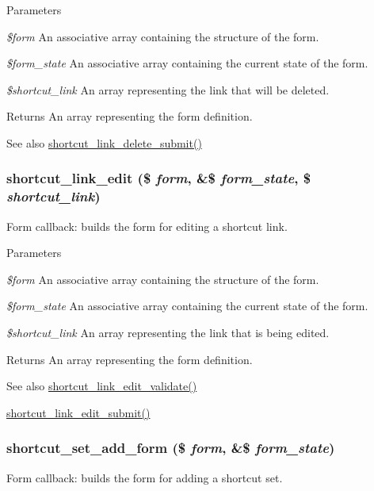 \begin{DoxyParams}{Parameters}
\item[{\em \$form}]An associative array containing the structure of the form. \item[{\em \$form\_\-state}]An associative array containing the current state of the form. \item[{\em \$shortcut\_\-link}]An array representing the link that will be deleted.\end{DoxyParams}
\begin{DoxyReturn}{Returns}
An array representing the form definition.
\end{DoxyReturn}
\begin{DoxySeeAlso}{See also}
\hyperlink{shortcut_8admin_8inc_a3fd35e609a462a9655b912672be3ed4d}{shortcut\_\-link\_\-delete\_\-submit()} 
\end{DoxySeeAlso}
\hypertarget{group__forms_gab5cd373d268cb28d52f75cd0309da63c}{
\subsubsection[{shortcut\_\-link\_\-edit}]{\setlength{\rightskip}{0pt plus 5cm}shortcut\_\-link\_\-edit (\$ {\em form}, \/  \&\$ {\em form\_\-state}, \/  \$ {\em shortcut\_\-link})}}
\label{group__forms_gab5cd373d268cb28d52f75cd0309da63c}
Form callback: builds the form for editing a shortcut link.


\begin{DoxyParams}{Parameters}
\item[{\em \$form}]An associative array containing the structure of the form. \item[{\em \$form\_\-state}]An associative array containing the current state of the form. \item[{\em \$shortcut\_\-link}]An array representing the link that is being edited.\end{DoxyParams}
\begin{DoxyReturn}{Returns}
An array representing the form definition.
\end{DoxyReturn}
\begin{DoxySeeAlso}{See also}
\hyperlink{shortcut_8admin_8inc_a91ed3ef518afe23ce152c277dc7b99cc}{shortcut\_\-link\_\-edit\_\-validate()} 

\hyperlink{shortcut_8admin_8inc_aacf3899caa37c7ba643625cd50bb7022}{shortcut\_\-link\_\-edit\_\-submit()} 
\end{DoxySeeAlso}
\hypertarget{group__forms_ga7c3cd4fdbb8948463aab7769fc5e07b8}{
\subsubsection[{shortcut\_\-set\_\-add\_\-form}]{\setlength{\rightskip}{0pt plus 5cm}shortcut\_\-set\_\-add\_\-form (\$ {\em form}, \/  \&\$ {\em form\_\-state})}}
\label{group__forms_ga7c3cd4fdbb8948463aab7769fc5e07b8}
Form callback: builds the form for adding a shortcut set.



